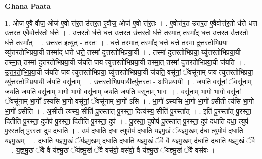 \documentclass[17pt]{extarticle}
\begin{document}
\textbf{Ghana Paata } \newline

1. ओज॑ ए॒वै वौज॒ ओज॑ ए॒वो त्त॑र॒त उ॑त्तर॒त ए॒वौज॒ ओज॑ ए॒वो त्त॑र॒तः । . ए॒वोत्त॑र॒त उ॑त्तर॒त ए॒वैवोत्त॑र॒तो ध॑त्ते धत्त उत्तर॒त ए॒वैवोत्त॑र॒तो ध॑त्ते । . उ॒त्त॒र॒तो ध॑त्ते धत्त उत्तर॒त उ॑त्तर॒तो ध॑त्ते॒ तस्मा॒त् तस्मा᳚द् धत्त उत्तर॒त उ॑त्तर॒तो ध॑त्ते॒ तस्मा᳚त् । . उ॒त्त॒र॒त इत्यु॑त् - त॒र॒तः । . ध॒त्ते॒ तस्मा॒त् तस्मा᳚द् धत्ते धत्ते॒ तस्मा॑ दुत्तरतोभिप्रया॒ य्यु॑त्तरतोभिप्रया॒यी तस्मा᳚द् धत्ते धत्ते॒ तस्मा॑ दुत्तरतोभिप्रया॒यी । . तस्मा॑ दुत्तरतोभिप्रया॒ य्यु॑त्तरतोभिप्रया॒यी तस्मा॒त् तस्मा॑ दुत्तरतोभिप्रया॒यी ज॑यति जय त्युत्तरतोभिप्रया॒यी तस्मा॒त् तस्मा॑ दुत्तरतोभिप्रया॒यी ज॑यति । . उ॒त्त॒र॒तो॒भि॒प्र॒या॒यी ज॑यति जय त्युत्तरतोभिप्रया॒ य्यु॑त्तरतोभिप्रया॒यी ज॑यति॒ वसू॑नां॒ ॅवसू॑नाम् जय त्युत्तरतोभिप्रया॒ य्यु॑त्तरतोभिप्रया॒यी ज॑यति॒ वसू॑नाम् । . उ॒त्त॒र॒तो॒भि॒प्र॒या॒यीत्यु॑त्तरतः - अ॒भि॒प्र॒या॒यी । . ज॒य॒ति॒ वसू॑नां॒ ॅवसू॑नाम् जयति जयति॒ वसू॑नाम् भा॒गो भा॒गो वसू॑नाम् जयति जयति॒ वसू॑नाम् भा॒गः । . वसू॑नाम् भा॒गो भा॒गो वसू॑नां॒ ॅवसू॑नाम् भा॒गो᳚ ऽस्यसि भा॒गो वसू॑नां॒ ॅवसू॑नाम् भा॒गो॑ ऽसि । . भा॒गो᳚ ऽस्यसि भा॒गो भा॒गो॑ ऽसीती त्य॑सि भा॒गो भा॒गो॑ ऽसीति॑ । . अ॒सीती त्य॑स्य॒ सीति॑ पु॒रस्ता᳚त् पु॒रस्ता॒ दित्य॑स्य॒ सीति॑ पु॒रस्ता᳚त् । . इति॑ पु॒रस्ता᳚त् पु॒रस्ता॒ दितीति॑ पु॒रस्ता॒ दुपोप॑ पु॒रस्ता॒ दितीति॑ पु॒रस्ता॒ दुप॑ । . पु॒रस्ता॒ दुपोप॑ पु॒रस्ता᳚त् पु॒रस्ता॒ दुप॑ दधाति दधा॒ त्युप॑ पु॒रस्ता᳚त् पु॒रस्ता॒ दुप॑ दधाति । . उप॑ दधाति दधा॒ त्युपोप॑ दधाति यज्ञ्मु॒खं ॅय॑ज्ञ्मु॒खम् द॑धा॒ त्युपोप॑ दधाति यज्ञ्मु॒खम् । . द॒धा॒ति॒ य॒ज्ञ्॒मु॒खं ॅय॑ज्ञ्मु॒खम् द॑धाति दधाति यज्ञ्मु॒खं ॅवै वै य॑ज्ञ्मु॒खम् द॑धाति दधाति यज्ञ्मु॒खं ॅवै । . य॒ज्ञ्॒मु॒खं ॅवै वै य॑ज्ञ्मु॒खं ॅय॑ज्ञ्मु॒खं ॅवै वस॑वो॒ वस॑वो॒ वै य॑ज्ञ्मु॒खं ॅय॑ज्ञ्मु॒खं ॅवै वस॑वः । \newline
\end{document}
